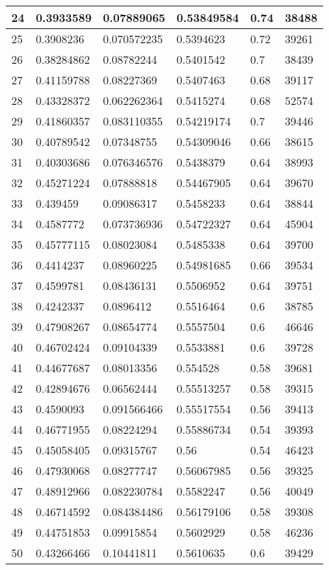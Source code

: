 \begin{longtable}{|l|l|l|l|l|l|}
24 & 0.3933589 & 0.07889065 & 0.53849584 & 0.74 & 38488 \\ \hline 
25 & 0.3908236 & 0.070572235 & 0.5394623 & 0.72 & 39261 \\ \hline 
26 & 0.38284862 & 0.08782244 & 0.5401542 & 0.7 & 38439 \\ \hline 
27 & 0.41159788 & 0.08227369 & 0.5407463 & 0.68 & 39117 \\ \hline 
28 & 0.43328372 & 0.062262364 & 0.5415274 & 0.68 & 52574 \\ \hline 
29 & 0.41860357 & 0.083110355 & 0.54219174 & 0.7 & 39446 \\ \hline 
30 & 0.40789542 & 0.07348755 & 0.54309046 & 0.66 & 38615 \\ \hline 
31 & 0.40303686 & 0.076346576 & 0.5438379 & 0.64 & 38993 \\ \hline 
32 & 0.45271224 & 0.07888818 & 0.54467905 & 0.64 & 39670 \\ \hline 
33 & 0.439459 & 0.09086317 & 0.5458233 & 0.64 & 38844 \\ \hline 
34 & 0.4587772 & 0.073736936 & 0.54722327 & 0.64 & 45904 \\ \hline 
35 & 0.45777115 & 0.08023084 & 0.5485338 & 0.64 & 39700 \\ \hline 
36 & 0.4414237 & 0.08960225 & 0.54981685 & 0.66 & 39534 \\ \hline 
37 & 0.4599781 & 0.08436131 & 0.5506952 & 0.64 & 39751 \\ \hline 
38 & 0.4242337 & 0.0896412 & 0.5516464 & 0.6 & 38785 \\ \hline 
39 & 0.47908267 & 0.08654774 & 0.5557504 & 0.6 & 46646 \\ \hline 
40 & 0.46702424 & 0.09104339 & 0.5533881 & 0.6 & 39728 \\ \hline 
41 & 0.44677687 & 0.08013356 & 0.554528 & 0.58 & 39681 \\ \hline 
42 & 0.42894676 & 0.06562444 & 0.55513257 & 0.58 & 39315 \\ \hline 
43 & 0.4590093 & 0.091566466 & 0.55517554 & 0.56 & 39413 \\ \hline 
44 & 0.46771955 & 0.08224294 & 0.55886734 & 0.54 & 39393 \\ \hline 
45 & 0.45058405 & 0.09315767 & 0.56 & 0.54 & 46423 \\ \hline 
46 & 0.47930068 & 0.08277747 & 0.56067985 & 0.56 & 39325 \\ \hline 
47 & 0.48912966 & 0.082230784 & 0.5582247 & 0.56 & 40049 \\ \hline 
48 & 0.46714592 & 0.084384486 & 0.56179106 & 0.58 & 39308 \\ \hline 
49 & 0.44751853 & 0.09915854 & 0.5602929 & 0.58 & 46236 \\ \hline 
50 & 0.43266466 & 0.10441811 & 0.5610635 & 0.6 & 39429 \\ \hline 
\end{longtable}